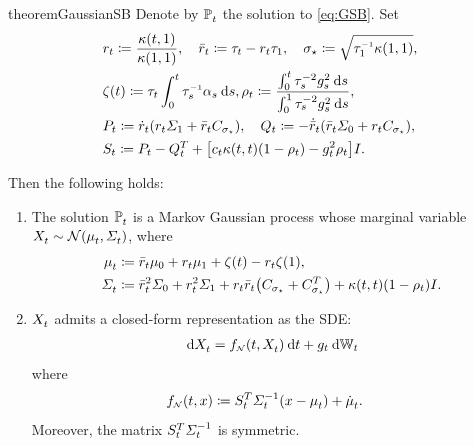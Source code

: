 \begin{restatable}{theorem}{GaussianSB}
\label{thm:gaussian_sb}
Denote by $\mathbb{P}^{}_{ t }$ the solution to  \eqref{eq:GSB}. Set 
\begin{align}
\nn
&\ratio \defeq \frac{\kernel[\ctime][\horizon]  }{ \kernel[\horizon][\horizon]},\quad \ratioc \defeq \aggtime - \ratio \aggtime[\horizon],\quad \sigma_\star \defeq \sqrt{ \aggtimeinv[\horizon]\kernel[\horizon][\horizon]}, \\ 
\nn
&\tshift \defeq \aggtime\int_0^\ctime \aggtimeinv\shift[\ctimealt]\dd \ctimealt, \efftr \defeq \frac{\intdasq}{\intdasqT}, \\
\nn
&P_\ctime \defeq \dratio\parens*{\ratio \covaralt + \ratioc C_{\sigma_\star}}, \quad Q_\ctime \defeq -\dratioc\parens*{\ratioc\covar + \ratio C_{\sigma_\star}}, 
\\ 
&S_\ctime \defeq P_\ctime -  Q_\ctime^T  + \bracks*{ \drift \kernel[\ctime][\ctime] \parens*{ 1- \efftr }  -  \volatsq[\ctime] \efftr  }\eye.
\label{eq:functions}
\end{align} 

Then the following holds:
\begin{enumerate}[leftmargin=.5cm,itemsep=.01cm,topsep=0cm]
\item The solution $\mathbb{P}^{}_{ t }$ is a Markov Gaussian process whose marginal variable $\Xsol \sim\Ncal\parens*{\meansol,\Sigmasol}$, where
\begin{align}
\label{eq:meansol}
\meansol &\defeq \ratioc \m + \ratio \malt + \tshift - \ratio \tshift[\horizon], \\
\label{eq:covsol}
\Sigmasol&\defeq \ratioc^2\covar + \ratio^2 \covaralt + \ratio\ratioc \parens*{ C_{\sigma_\star} + C_{\sigma_\star}^T  } +  \kernel[\ctime][\ctime]  \parens*{ 1- \efftr } \eye.
\end{align} %
\item $X^{}_{ t }$ admits a closed-form representation as the \acrshort{SDE}:
\begin{align}
\label{eq:GSB-forward-sol}
\dXsol = \GSBf[\ctime][\Xsol] \dd \ctime + \volat\dWiener[\ctime]
\end{align}where 
\begin{align}
\label{eq:GSB-forward}
\GSBf &\defeq \St^T \Sigmasolinv\parens*{\point - \meansol} + \dmeansol.
\end{align}Moreover, the matrix $S_t^T \Sigma^{-1}_{ t }$ is symmetric.
\end{enumerate}
\end{restatable}

